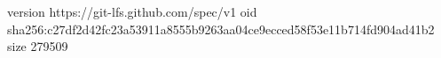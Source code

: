 version https://git-lfs.github.com/spec/v1
oid sha256:c27df2d42fc23a53911a8555b9263aa04ce9ecced58f53e11b714fd904ad41b2
size 279509
